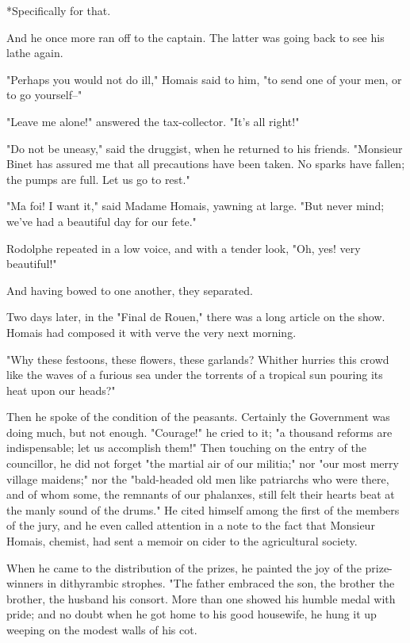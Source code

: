 \documentclass[11pt,twocolumn]{ltugboat}
\begin{document}
     *Specifically for that.

And he once more ran off to the captain. The latter was going back to
see his lathe again.

"Perhaps you would not do ill," Homais said to him, "to send one of your
men, or to go yourself--"

"Leave me alone!" answered the tax-collector. "It's all right!"

"Do not be uneasy," said the druggist, when he returned to his friends.
"Monsieur Binet has assured me that all precautions have been taken. No
sparks have fallen; the pumps are full. Let us go to rest."

"Ma foi! I want it," said Madame Homais, yawning at large. "But never
mind; we've had a beautiful day for our fete."

Rodolphe repeated in a low voice, and with a tender look, "Oh, yes! very
beautiful!"

And having bowed to one another, they separated.

Two days later, in the "Final de Rouen," there was a long article on the
show. Homais had composed it with verve the very next morning.

"Why these festoons, these flowers, these garlands? Whither hurries this
crowd like the waves of a furious sea under the torrents of a tropical
sun pouring its heat upon our heads?"

Then he spoke of the condition of the peasants. Certainly the Government
was doing much, but not enough. "Courage!" he cried to it; "a thousand
reforms are indispensable; let us accomplish them!" Then touching on
the entry of the councillor, he did not forget "the martial air of our
militia;" nor "our most merry village maidens;" nor the "bald-headed old
men like patriarchs who were there, and of whom some, the remnants of
our phalanxes, still felt their hearts beat at the manly sound of the
drums." He cited himself among the first of the members of the jury,
and he even called attention in a note to the fact that Monsieur Homais,
chemist, had sent a memoir on cider to the agricultural society.

When he came to the distribution of the prizes, he painted the joy of
the prize-winners in dithyrambic strophes. "The father embraced the son,
the brother the brother, the husband his consort. More than one showed
his humble medal with pride; and no doubt when he got home to his good
housewife, he hung it up weeping on the modest walls of his cot.
\end{document}

